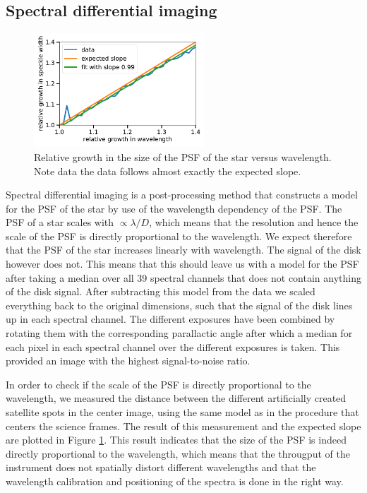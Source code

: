 \documentclass[twoside,single]{lion-msc}
\begin{document}
\subsection{Spectral differential imaging}
\begin{figure}
\centering
\includegraphics[width = 0.57\textwidth]{specklegrowth}
\caption{Relative growth in the size of the PSF of the star versus wavelength. Note data the data follows almost exactly the expected slope.}
\label{fig:specklegrowth}
\end{figure}
Spectral differential imaging is a post-processing method that constructs a model for the PSF of the star by use of the wavelength dependency of the PSF. The PSF of a star scales with $ \propto\lambda/D$, which means that the resolution and hence the scale of the PSF is directly proportional to the wavelength. We expect therefore that the PSF of the star increases linearly with wavelength. The signal of the disk however does not. This means that this should leave us with a model for the PSF after taking a median over all 39 spectral channels that does not contain anything of the disk signal. After subtracting this model from the data we scaled everything back to the original dimensions, such that the signal of the disk lines up in each spectral channel. The different exposures have been combined by rotating them with the corresponding parallactic angle after which a median for each pixel in each spectral channel over the different exposures is taken. This provided an image with the highest signal-to-noise ratio.
\bigskip

In order to check if the scale of the PSF is directly proportional to the wavelength, we measured the distance between the different artificially created satellite spots in the center image, using the same model as in the procedure that centers the science frames. The result of this measurement and the expected slope are plotted in Figure \ref{fig:specklegrowth}. This result indicates that the size of the PSF is indeed directly proportional to the wavelength, which means that the througput of the instrument does not spatially distort different wavelengths and that the wavelength calibration and positioning of the spectra is done in the right way.
\bigskip
\end{document}
